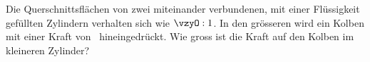 Die Querschnittsflächen von zwei miteinander verbundenen, mit einer Flüssigkeit gefüllten Zylindern verhalten sich wie $\vzyO : 1$. In den grösseren wird ein Kolben mit einer Kraft von \FzgO\ hineingedrückt. Wie gross ist die Kraft auf den Kolben im kleineren Zylinder?
